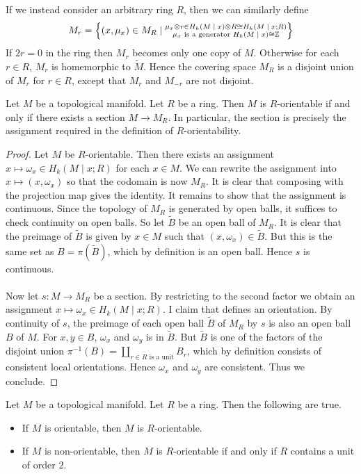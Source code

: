 \documentclass[a4paper]{article}
\begin{document}
If we instead consider an arbitrary ring $R$, then we can similarly define $$M_r=\left\{(x,\mu_x)\in M_R\;|\;\substack{\mu_x\otimes r\in H_k(M\;|\; x)\otimes R\cong H_k(M\;|\; x;R)\\\mu_x\text{ is a generator }H_k(M\;|\;x)\cong\mathbb{Z}}\right\}$$ If $2r=0$ in the ring then $M_r$ becomes only one copy of $M$. Otherwise for each $r\in R$, $M_r$ is homemorphic to $\widetilde{M}$. Hence the covering space $M_R$ is a disjoint union of $M_r$ for $r\in R$, except that $M_r$ and $M_{-r}$ are not disjoint. 

\begin{lmm}{}{} Let $M$ be a topological manifold. Let $R$ be a ring. Then $M$ is $R$-orientable if and only if there exists a section $M\to M_R$. In particular, the section is precisely the assignment required in the definition of $R$-orientability. \tcbline
\begin{proof}
Let $M$ be $R$-orientable. Then there exists an assignment $x\mapsto\omega_x\in H_k(M\;|\;x;R)$ for each $x\in M$. We can rewrite the assignment into $x\mapsto(x,\omega_x)$ so that the codomain is now $M_R$. It is clear that composing with the projection map gives the identity. It remains to show that the assignment is continuous. Since the topology of $M_R$ is generated by open balls, it suffices to check continuity on open balls. So let $\widetilde{B}$ be an open ball of $M_R$. It is clear that the preimage of $\widetilde{B}$ is given by $x\in M$ such that $(x,\omega_x)\in\widetilde{B}$. But this is the same set as $B=\pi(\widetilde{B})$, which by definition is an open ball. Hence $s$ is continuous. \\~\\

Now let $s:M\to M_R$ be a section. By restricting to the second factor we obtain an assignment $x\mapsto\omega_x\in H_k(M\;|\;x;R)$. I claim that defines an orientation. By continuity of $s$, the preimage of each open ball $\widetilde{B}$ of $M_R$ by $s$ is also an open ball $B$ of $M$. For $x,y\in B$, $\omega_x$ and $\omega_y$ is in $\widetilde{B}$. But $\widetilde{B}$ is one of the factors of the disjoint union $\pi^{-1}(B)=\coprod_{r\in R\text{ is a unit}}B_r$, which by definition consists of consistent local orientations. Hence $\omega_x$ and $\omega_y$ are consistent. Thus we conclude. 
\end{proof}
\end{lmm}

\begin{lmm}{}{} Let $M$ be a topological manifold. Let $R$ be a ring. Then the following are true. 
\begin{itemize}
\item If $M$ is orientable, then $M$ is $R$-orientable. 
\item If $M$ is non-orientable, then $M$ is $R$-orientable if and only if $R$ contains a unit of order $2$. 
\end{itemize}
\end{lmm}
\end{document}
